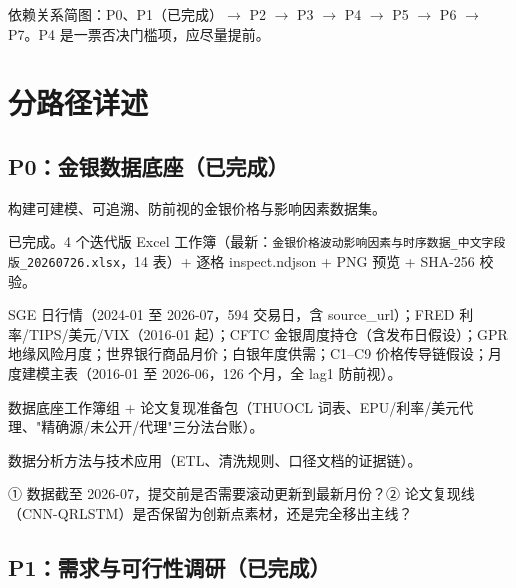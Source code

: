 \documentclass[UTF8,12pt]{ctexart}
\begin{document}
\noindent 依赖关系简图：\quad P0、P1（已完成）$\to$ P2 $\to$ P3 $\to$ P4 $\to$ P5 $\to$ P6 $\to$ P7。\quad P4 是一票否决门槛项，应尽量提前。

\section{分路径详述}

\subsection{P0：金银数据底座（已完成）}

\begin{description}[style=nextline]
\item[目标] 构建可建模、可追溯、防前视的金银价格与影响因素数据集。
\item[现状] 已完成。4 个迭代版 Excel 工作簿（最新：\texttt{金银价格波动影响因素与时序数据\_中文字段版\_20260726.xlsx}，14 表）+ 逐格 inspect.ndjson + PNG 预览 + SHA-256 校验。
\item[已有内容] SGE 日行情（2024-01 至 2026-07，594 交易日，含 source\_url）；FRED 利率/TIPS/美元/VIX（2016-01 起）；CFTC 金银周度持仓（含发布日假设）；GPR 地缘风险月度；世界银行商品月价；白银年度供需；C1--C9 价格传导链假设；月度建模主表（2016-01 至 2026-06，126 个月，全 lag1 防前视）。
\item[产出物] 数据底座工作簿组 + 论文复现准备包（THUOCL 词表、EPU/利率/美元代理、"精确源/未公开/代理"三分法台账）。
\item[对应评分项] 数据分析方法与技术应用（ETL、清洗规则、口径文档的证据链）。
\item[风险与待决问题] ① 数据截至 2026-07，提交前是否需要滚动更新到最新月份？② 论文复现线（CNN-QRLSTM）是否保留为创新点素材，还是完全移出主线？
\end{description}

\subsection{P1：需求与可行性调研（已完成）}
\end{document}
